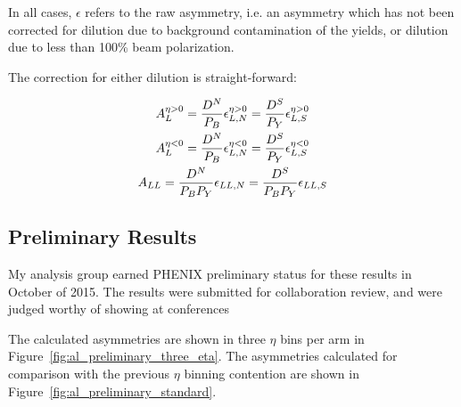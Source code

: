 In all cases, $\epsilon$ refers to the raw asymmetry, i.e. an asymmetry which
has not been corrected for dilution due to background contamination of the
yields, or dilution due to less than 100\% beam polarization.

{\noindent}The correction for either dilution is straight-forward:

\begin{gather}
  {A_L^{\eta>0}} = {{D^N}\over{P_B}}{\epsilon_{L,N}^{\eta>0}} = {{D^S}\over{P_Y}}{\epsilon_{L,S}^{\eta>0}} \\
  {A_L^{\eta<0}} = {{D^N}\over{P_B}}{\epsilon_{L,N}^{\eta<0}} = {{D^S}\over{P_Y}}{\epsilon_{L,S}^{\eta<0}} \\
  {A_{LL}}       = {{D^N}\over{P_BP_Y}}{\epsilon_{LL,N}}      = {{D^S}\over{P_BP_Y}}{\epsilon_{LL,S}}       
  \label{eq:dilution_correction}
\end{gather}

\subsection{Preliminary Results}

My analysis group earned PHENIX preliminary status for these results in October
of 2015.  The results were submitted for collaboration review,
and were judged worthy of showing at conferences 

The calculated asymmetries are shown in three $\eta$ bins per arm in
Figure~\ref{fig:al_preliminary_three_eta}. The asymmetries calculated for
comparison with the previous $\eta$ binning contention are shown in
Figure~\ref{fig:al_preliminary_standard}.

